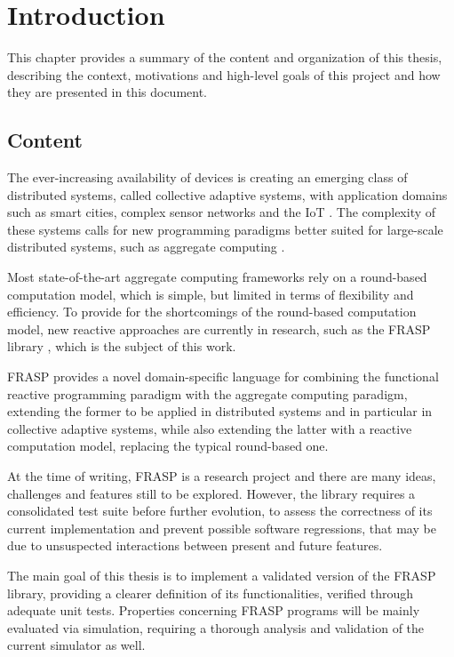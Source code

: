 \chapter{Introduction}
\label{chapter:introduction}

This chapter provides a summary of the content and organization of this thesis,
describing the context, motivations and high-level goals of this project and
how they are presented in this document.

\section{Content}

The ever-increasing availability of devices is creating an emerging class of
distributed systems, called collective adaptive systems, with application
domains such as smart cities, complex sensor networks and the \ac{IoT}
\cite{CAS-AggregateComputingBlocks}. The complexity of these systems calls for
new programming paradigms better suited for large-scale distributed systems,
such as aggregate computing \cite{FieldCalculus-AggregateComputing}.

Most state-of-the-art aggregate computing frameworks rely on a round-based
computation model, which is simple, but limited in terms of flexibility and
efficiency. To provide for the shortcomings of the round-based computation
model, new reactive approaches are currently in research, such as the FRASP
library \cite{FRASP}, which is the subject of this work.

FRASP provides a novel domain-specific language for combining the functional
reactive programming paradigm with the aggregate computing paradigm, extending
the former to be applied in distributed systems and in particular in collective
adaptive systems, while also extending the latter with a reactive computation
model, replacing the typical round-based one.

At the time of writing, FRASP is a research project and there are many ideas,
challenges and features still to be explored. However, the library requires a
consolidated test suite before further evolution, to assess the correctness of
its current implementation and prevent possible software regressions, that may
be due to unsuspected interactions between present and future features.

The main goal of this thesis is to implement a validated version of the FRASP
library, providing a clearer definition of its functionalities, verified
through adequate unit tests. Properties concerning FRASP programs will be
mainly evaluated via simulation, requiring a thorough analysis and validation
of the current simulator as well.

